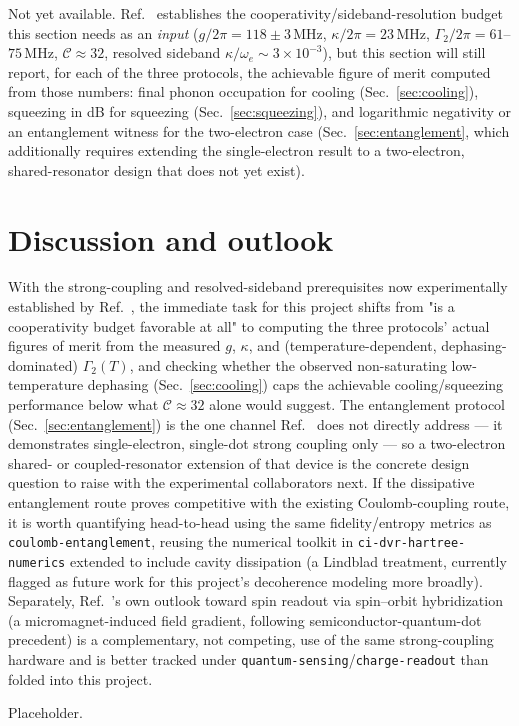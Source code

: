 \documentclass[aps,prapplied,reprint,superscriptaddress,longbibliography]{revtex4-2}
\begin{document}
Not yet available. Ref.~\cite{koolstra2026strong} establishes the cooperativity/sideband-resolution
budget this section needs as an \emph{input} ($g/2\pi=118\pm3\,\mathrm{MHz}$,
$\kappa/2\pi=23\,\mathrm{MHz}$, $\Gamma_2/2\pi=61$--$75\,\mathrm{MHz}$,
$\mathcal{C}\approx32$, resolved sideband $\kappa/\omega_e\sim3\times10^{-3}$), but this section will
still report, for each of the three protocols, the achievable figure of merit computed from those
numbers: final phonon occupation for cooling (Sec.~\ref{sec:cooling}), squeezing in dB for squeezing
(Sec.~\ref{sec:squeezing}), and logarithmic negativity or an entanglement witness for the two-electron
case (Sec.~\ref{sec:entanglement}, which additionally requires extending the single-electron result to
a two-electron, shared-resonator design that does not yet exist).

\section{Discussion and outlook}

With the strong-coupling and resolved-sideband prerequisites now experimentally established by
Ref.~\cite{koolstra2026strong}, the immediate task for this project shifts from "is a cooperativity
budget favorable at all" to computing the three protocols' actual figures of merit from the measured
$g$, $\kappa$, and (temperature-dependent, dephasing-dominated) $\Gamma_2(T)$, and checking whether
the observed non-saturating low-temperature dephasing (Sec.~\ref{sec:cooling}) caps the achievable
cooling/squeezing performance below what $\mathcal{C}\approx32$ alone would suggest. The entanglement
protocol (Sec.~\ref{sec:entanglement}) is the one channel Ref.~\cite{koolstra2026strong} does not
directly address — it demonstrates single-electron, single-dot strong coupling only — so a two-electron
shared- or coupled-resonator extension of that device is the concrete design question to raise with
the experimental collaborators next. If the dissipative entanglement route proves competitive with the
existing Coulomb-coupling route, it is worth quantifying head-to-head using the same fidelity/entropy
metrics as \texttt{coulomb-entanglement}, reusing the numerical toolkit in
\texttt{ci-dvr-hartree-numerics} extended to include cavity dissipation (a Lindblad treatment, currently
flagged as future work for this project's decoherence modeling more broadly). Separately,
Ref.~\cite{koolstra2026strong}'s own outlook toward spin readout via spin--orbit hybridization (a
micromagnet-induced field gradient, following semiconductor-quantum-dot precedent) is a complementary,
not competing, use of the same strong-coupling hardware and is better tracked under
\texttt{quantum-sensing}/\texttt{charge-readout} than folded into this project.

\begin{acknowledgments}
Placeholder.
\end{acknowledgments}


\end{document}
